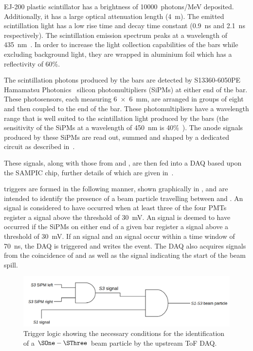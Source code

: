 EJ-200 plastic scintillator has a brightness of \num{10000}~photons/MeV deposited.
Additionally, it has a large optical attenuation length (\SI{4}{\metre}).
The emitted scintillation light has a low rise time and decay time constant (\SI{0.9}{\nano\second} and \SI{2.1}{\nano\second} respectively).
The scintillation emission spectrum peaks at a wavelength of \SI{435}{\nano\metre}~\cite{ej200}.
In order to increase the light collection capabilities of the bars while excluding background light, they are wrapped in aluminium foil which has a reflectivity of 60\%.

The scintillation photons produced by the bars are detected by S13360-6050PE Hamamatsu Photonics~\cite{hamamatsu} silicon photomultipliers (SiPMs) at either end of the bar.
These photosensors, each measuring \SI{6 x 6}{\milli\metre}, are arranged in groups of eight and then coupled to the end of the bar.
These photomultipliers have a wavelength range that is well suited to the scintillation light produced by the bars (the sensitivity of the SiPMs at a wavelength of \SI{450}{\nano\metre} is 40\%~\cite{hamamatsu}).
The anode signals produced by these SiPMs are read out, summed and shaped by a dedicated circuit as described in~\cite{s3SiPM}.

These signals, along with those from \SOne and \STwo, are then fed into a DAQ based upon the SAMPIC chip, further details of which are given in~\cite{sampic}.

\SThree triggers are formed in the following manner, shown graphically in , and are intended to identify the presence of a beam particle travelling between \SOne and \SThree.
An \SOne signal is considered to have occurred when at least three of the four \SOne PMTs register a signal above the threshold of \SI{30}{\milli\volt}.
An \SThree signal is deemed to have occurred if the SiPMs on either end of a given bar register a signal above a threshold of \SI{30}{\milli\volt}.
If an \SOne signal and an \SThree signal occur within a time window of \SI{70}{\nano\second}, the DAQ is triggered and writes the event.
The DAQ also acquires signals from the coincidence of \SOne and \STwo as well as the signal indicating the start of the beam spill.

\begin{figure}[h]
  \centering
  \includegraphics[width=.8\linewidth]{files/figures/hptpc_beam_flux/utofTrig}
  \caption[Trigger logic for the upstream time of flight DAQ.]{Trigger logic showing the necessary conditions for the identification of a $\SOne-\SThree$ beam particle by the upstream ToF DAQ.}
  \label{fig:s3Trigger}
\end{figure}


